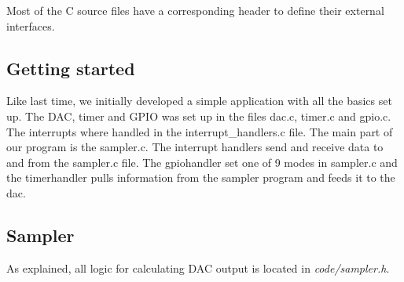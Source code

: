 Most of the C source files have a corresponding header to define their external interfaces.

\subsection{Getting started}
Like last time, we initially developed a simple application with all the basics set up. The DAC, timer and GPIO was set up in the files dac.c, timer.c and gpio.c. The interrupts where handled in the interrupt\_handlers.c file. The main part of our program is the sampler.c. The interrupt handlers send and receive data to and from the sampler.c file. The gpiohandler set one of 9 modes in sampler.c and the timerhandler pulls information from the sampler program and feeds it to the dac. 

\subsection{Sampler}
As explained, all logic for calculating DAC output is located in \emph{code/sampler.h}.
